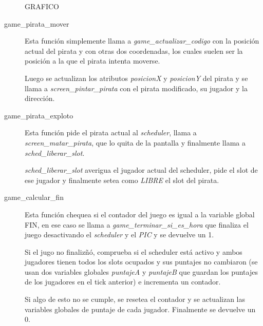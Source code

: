 \begin{description}
GRAFICO

\item[game_pirata_mover]
  Esta función simplemente llama a {\it game_actualizar_codigo\/} con la
  posición actual del pirata y con otras dos coordenadas, los cuales suelen ser la
  posición a la que el pirata intenta moverse.

  Luego se actualizan los atributos {\it posicionX\/} y {\it posicionY\/} del
  pirata y se llama a {\it screen_pintar_pirata\/} con el pirata modificado, su
  jugador y la dirección.

\item[game_pirata_exploto]
  Esta función pide el pirata actual al {\it scheduler\/}, llama a
  {\it screen_matar_pirata\/}, que lo quita de la pantalla y finalmente llama a
  {\it sched_liberar_slot\/}.

  {\it sched_liberar_slot\/} averigua el jugador actual del scheduler, pide el
  slot de ese jugador y finalmente setea como {\it LIBRE\/} el slot del pirata.

\item[game_calcular_fin]
  Esta función chequea si el contador del juego es igual a la variable global
  FIN, en ese caso se llama a {\it game_terminar_si_es_hora\/} que finaliza el
  juego desactivando el {\it scheduler\/} y el {\it PIC\/} y se devuelve un 1.

  Si el jugo no finalizñó, comprueba si el scheduler está activo y ambos
  jugadores tienen todos los slots ocupados y sus puntajes no cambiaron
  (se usan dos variables globales {\it puntajeA\/} y {\it puntajeB\/} que guardan
  los puntajes de los jugadores en el tick anterior) e incrementa un contador.

  Si algo de esto no se cumple, se resetea el contador y se actualizan las
  variables globales de puntaje de cada jugador. Finalmente se devuelve un 0.

\end{description}
